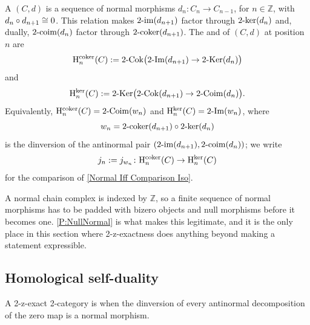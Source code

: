 \begin{definition}
  \label{Def:Homology}  \leanok
  A  \((C,d)\) is a sequence of normal morphisms \(d_n\colon C_n\to C_{n-1}\), for \(n\in\mathbb{Z}\), with \(d_n\circ d_{n+1}\cong 0\). This relation makes \(2\text{-}\mathrm{im}(d_{n+1})\) factor through \(2\text{-}\mathrm{ker}(d_n)\) and, dually, \(2\text{-}\mathrm{coim}(d_n)\) factor through \(2\text{-}\mathrm{coker}(d_{n+1})\). The  and  of \((C,d)\) at position \(n\) are
	\[
		\mathrm{H}^{\mathrm{coker}}_{n}(C)\mathrel{:=}2\text{-}\mathrm{Cok}\bigl(2\text{-}\mathrm{Im}(d_{n+1})\to2\text{-}\mathrm{Ker}(d_n)\bigr)
	\]
	and
	\[
		\mathrm{H}^{\ker}_{n}(C)\mathrel{:=}2\text{-}\mathrm{Ker}\bigl(2\text{-}\mathrm{Cok}(d_{n+1})\to2\text{-}\mathrm{Coim}(d_n)\bigr)\text{.}
	\]
	Equivalently, \(\mathrm{H}^{\mathrm{coker}}_{n}(C)=2\text{-}\mathrm{Coim}(w_n)\) and \(\mathrm{H}^{\ker}_{n}(C)=2\text{-}\mathrm{Im}(w_n)\), where
	\[
		w_n=2\text{-}\mathrm{coker}(d_{n+1})\circ2\text{-}\mathrm{ker}(d_n)
	\]
	is the dinversion of the antinormal pair \((2\text{-}\mathrm{im}(d_{n+1}),2\text{-}\mathrm{coim}(d_n))\); we write
	\[
		j_n\mathrel{:=} j_{w_n}\colon\mathrm{H}^{\mathrm{coker}}_{n}(C)\to\mathrm{H}^{\ker}_{n}(C)
	\]
	for the comparison of \lemx\ref{Normal Iff Comparison Iso}.
\end{definition}

\begin{remark}
  \label{Rem Padding}
  A normal chain complex is indexed by \(\mathbb{Z}\), so a finite sequence of normal morphisms has to be padded with bizero objects and null morphisms before it becomes one. \prox\ref{P:NullNormal} is what makes this legitimate, and it is the only place in this section where 2-z-exactness does anything beyond making a statement expressible.
\end{remark}

\subsection{Homological self-duality}\label{SS:HSD}

\begin{definition}
  \label{Def:HSD}  \leanok
  A 2-z-exact 2-category is  when the dinversion of every antinormal decomposition of the zero map is a normal morphism.
\end{definition}

